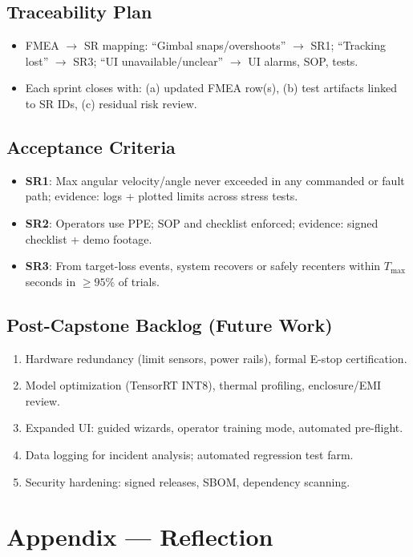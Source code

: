 \documentclass{article}
\begin{document}
\subsection{Traceability Plan}
\begin{itemize}
  \item FMEA \(\rightarrow\) SR mapping: “Gimbal snaps/overshoots” \(\rightarrow\) SR1;
        “Tracking lost” \(\rightarrow\) SR3; “UI unavailable/unclear” \(\rightarrow\)
        UI alarms, SOP, tests.
  \item Each sprint closes with: (a) updated FMEA row(s), (b) test artifacts linked to
        SR IDs, (c) residual risk review.
\end{itemize}

\subsection{Acceptance Criteria}
\begin{itemize}
  \item \textbf{SR1}: Max angular velocity/angle never exceeded in any commanded or fault path; evidence: logs + plotted limits across stress tests.
  \item \textbf{SR2}: Operators use PPE; SOP and checklist enforced; evidence: signed checklist + demo footage.
  \item \textbf{SR3}: From target-loss events, system recovers or safely recenters within \(T_{\max}\) seconds in \(\geq 95\%\) of trials.
\end{itemize}

\subsection{Post-Capstone Backlog (Future Work)}
\begin{enumerate}
  \item Hardware redundancy (limit sensors, power rails), formal E-stop certification.
  \item Model optimization (TensorRT INT8), thermal profiling, enclosure/EMI review.
  \item Expanded UI: guided wizards, operator training mode, automated pre-flight.
  \item Data logging for incident analysis; automated regression test farm.
  \item Security hardening: signed releases, SBOM, dependency scanning.
\end{enumerate}
\newpage{}

\section*{Appendix --- Reflection}
\end{document}
